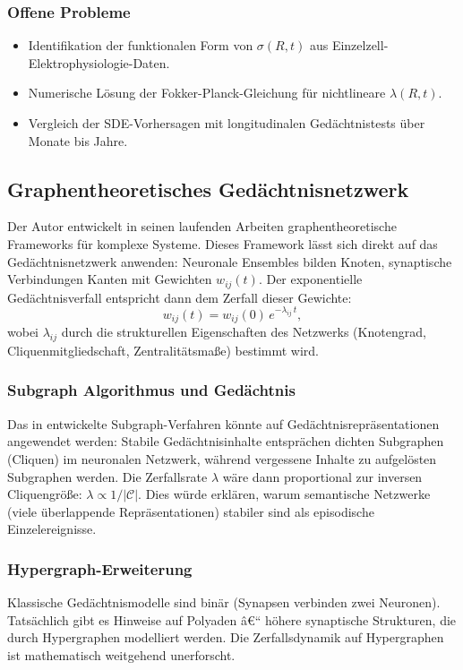 ﻿\documentclass[12pt,a4paper,twoside]{article}
\theoremstyle{theormstyle}
\theoremstyle{proofstyle}
\begin{document}
	\subsubsection{Offene Probleme}
	\begin{itemize}
		\item Identifikation der funktionalen Form von $\sigma(R, t)$ aus
		Einzelzell-Elektrophysiologie-Daten.
		\item Numerische Lösung der Fokker-Planck-Gleichung für
		nichtlineare $\lambda(R,t)$.
		\item Vergleich der SDE-Vorhersagen mit longitudinalen Gedächtnistests
		über Monate bis Jahre.
	\end{itemize}
	
	\subsection{Graphentheoretisches Gedächtnisnetzwerk}
	
	Der Autor entwickelt in seinen laufenden Arbeiten
	\citep{epp2026subgraph,epp2026vadis} graphentheoretische Frameworks
	für komplexe Systeme. Dieses Framework lässt sich direkt auf das
	Gedächtnisnetzwerk anwenden: Neuronale Ensembles bilden Knoten,
	synaptische Verbindungen Kanten mit Gewichten $w_{ij}(t)$.
	Der exponentielle Gedächtnisverfall entspricht dann dem Zerfall
	dieser Gewichte:
	\[
	w_{ij}(t) = w_{ij}(0)\,e^{-\lambda_{ij}\,t},
	\]
	wobei $\lambda_{ij}$ durch die strukturellen Eigenschaften des
	Netzwerks (Knotengrad, Cliquenmitgliedschaft, Zentralitätsmaße)
	bestimmt wird.
	
	\subsubsection{Subgraph Algorithmus und Gedächtnis}
	Das in \citep{epp2026subgraph} entwickelte Subgraph-Verfahren könnte
	auf Gedächtnisrepräsentationen angewendet werden: Stabile Gedächtnisinhalte
	entsprächen dichten Subgraphen (Cliquen) im neuronalen Netzwerk,
	während vergessene Inhalte zu aufgelösten Subgraphen werden.
	Die Zerfallsrate $\lambda$ wäre dann proportional zur inversen Cliquengröße:
	$\lambda \propto 1/|\mathcal{C}|$.
	Dies würde erklären, warum semantische Netzwerke (viele überlappende
	Repräsentationen) stabiler sind als episodische Einzelereignisse.
	
	\subsubsection{Hypergraph-Erweiterung}
	Klassische Gedächtnismodelle sind binär (Synapsen verbinden zwei Neuronen).
	Tatsächlich gibt es Hinweise auf Polyaden â€“ höhere synaptische Strukturen,
	die durch Hypergraphen modelliert werden. Die Zerfallsdynamik auf
	Hypergraphen ist mathematisch weitgehend unerforscht.
	
\end{document}

